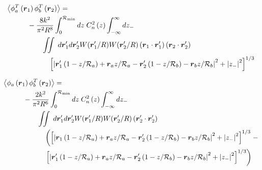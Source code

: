 \begin{equation}\label{tphase_n4}
\begin{aligned}
&\left\langle \phi^{T}_{a}\left(\boldsymbol{r}_{1}\right) \phi^{T}_{b}\left(\boldsymbol{r}_{2}\right)\right\rangle = \\
&\quad\quad\quad
-\frac{8k^{2}}{\pi^{2}R^{8}} \int_{0}^{\mathcal{R}_{\rm min}} dz\;C_{n}^{2}\left(z\right)
\int_{-\infty}^{\infty} dz_{-} \\
&\quad\quad\quad\quad\quad 
\iint \; d\boldsymbol{r}^{\prime}_{1}d\boldsymbol{r}^{\prime}_{2} W(\boldsymbol{r}^{\prime}_{1}/R) W(\boldsymbol{r}^{\prime}_{2}/R)
\left(\boldsymbol{r}_{1} \cdot \boldsymbol{r}^{\prime}_{1}\right)
\left(\boldsymbol{r}_{2} \cdot \boldsymbol{r}^{\prime}_{2}\right)
\\
&\quad\quad\quad\quad\quad\quad
\left[ \left\vert \boldsymbol{r}^{\prime}_{1}\left(1-z/\mathcal{R}_{a}\right) + \boldsymbol{r}_{a} z/\mathcal{R}_{a} - 
 \boldsymbol{r}^{\prime}_{2}\left(1-z/\mathcal{R}_{b}\right) - \boldsymbol{r}_{b} z/\mathcal{R}_{b}\right\vert^{2} + 
\left\vert z_{-} \right\vert^{2} \right]^{1/3}
\end{aligned}
\end{equation}

\begin{equation}\label{tprphase_n4}
\begin{aligned}
&\left\langle \phi_{a}\left(\boldsymbol{r}_{1}\right) \phi^{T}_{b}\left(\boldsymbol{r}_{2}\right)\right\rangle = \\
&\quad\quad\quad
-\frac{2k^{2}}{\pi^{2}R^{6}} \int_{0}^{\mathcal{R}_{\rm min}} dz\;C_{n}^{2}\left(z\right) 
\int_{-\infty}^{\infty} dz_{-} \\
&\quad\quad\quad\quad\quad 
\iint  \; d\boldsymbol{r}^{\prime}_{1}d\boldsymbol{r}^{\prime}_{2} W(\boldsymbol{r}^{\prime}_{1}/R) W(\boldsymbol{r}^{\prime}_{2}/R)
\left(\boldsymbol{r}^{\prime}_{2} \cdot \boldsymbol{r}^{\prime}_{2}\right)
\\
&\quad\quad\quad\quad\quad\quad
\left(
\left[\left\vert \boldsymbol{r}_{1}\left(1-z/\mathcal{R}_{a}\right) + \boldsymbol{r}_{a} z/\mathcal{R}_{a} - \boldsymbol{r}^{\prime}_{2}\left(1-z/\mathcal{R}_{b}\right) - \boldsymbol{r}_{b} z/\mathcal{R}_{b}\right\vert^{2}   + 
\left\vert z_{-} \right\vert^{2}\right]^{1/3}
\right. -
\\
&\quad\quad\quad\quad\quad\quad
\left.
\left[ \left\vert \boldsymbol{r}^{\prime}_{1}\left(1-z/\mathcal{R}_{a}\right) + \boldsymbol{r}_{a} z/\mathcal{R}_{a} - 
 \boldsymbol{r}^{\prime}_{2}\left(1-z/\mathcal{R}_{b}\right) - \boldsymbol{r}_{b} z/\mathcal{R}_{b}\right\vert^{2} + 
\left\vert z_{-} \right\vert^{2}\right]^{1/3}
\right)
\end{aligned}
\end{equation}

